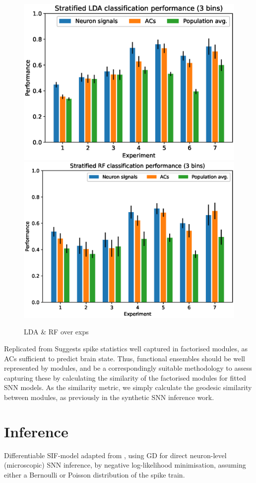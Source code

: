 \documentclass[mphil,deptreport,ianc]{infthesis} %
\begin{document}
\begin{figure}
    \centering
    \includegraphics[width=0.49\columnwidth]{figures/LDA/bars_LDA_per_signal_t_3.eps}
    \includegraphics[width=0.49\columnwidth]{figures/LDA/bars_RF_per_signal_t_3.eps}
    \caption{LDA \& RF over exps}
\end{figure}

Replicated from \cite{Tsunematsu2019} %
Suggests spike statistics well captured in factorised modules, as ACs sufficient to predict brain state.
Thus, functional ensembles should be well represented by modules, and be a correspondingly suitable methodology to assess capturing these by calculating the similarity of the factorised modules for fitted SNN models.
As the similarity metric, we simply calculate the geodesic similarity between modules, as previously in the synthetic SNN inference work.


\section{Inference}

Differentiable SIF-model adapted from \cite{Rene2020}, using GD for direct neuron-level (microscopic) SNN inference, by negative log-likelihood minimisation, assuming either a Bernoulli or Poisson distribution of the spike train.
\end{document}
